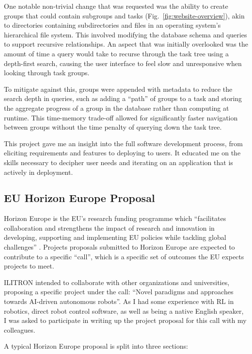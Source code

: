 One notable non-trivial change that was requested was the ability to create groups that could
contain subgroups and tasks (Fig.~\ref{fig:website-overview}), akin to directories containing
subdirectories and files in an operating system's hierarchical file system. This involved modifying
the database schema and queries to support recursive relationships. An aspect that was initially
overlooked was the amount of time a query would take to recurse through the task tree using a
depth-first search, causing the user interface to feel slow and unresponsive when looking through
task groups.

To mitigate against this, groups were appended with metadata to reduce the search depth
in queries, such as adding a \enquote{path} of groups to a task and storing the aggregate progress
of a group in the database rather than computing at runtime. This time-memory trade-off allowed for
significantly faster navigation between groups without the time penalty of querying down the task
tree.

This project gave me an insight into the full software development process, from eliciting
requirements and features to deploying to users. It educated me on the skills necessary to decipher
user needs and iterating on an application that is actively in deployment.

\subsection{EU Horizon Europe Proposal}
\label{sec:eu-proposal}

Horizon Europe is the EU's research funding programme which \enquote{facilitates collaboration and
    strengthens the impact of research and innovation in developing, supporting and implementing EU
    policies while tackling global challenges} \autocite{horizoneurope}. Projects proposals
submitted to Horizon Europe are expected to contribute to a specific \enquote{call}, which is a
specific set of outcomes the EU expects projects to meet.

ILITRON intended to collaborate with other organizations and universities, proposing a specific
project under the call: \enquote{Novel paradigms and approaches towards AI-driven autonomous
    robots}. As I had some experience with RL in robotics, direct robot control software, as well as
being a native English speaker, I was asked to participate in writing up the project proposal for
this call with my colleagues.

A typical Horizon Europe proposal is split into three sections:

